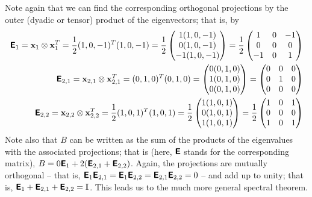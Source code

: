 {Note again that we can find the corresponding orthogonal projections by the outer (dyadic or tensor) product
of the eigenvectors; that is,  by
\begin{equation}
\begin{split}
\textsf{\textbf{E}}_1 =
{\bf x}_1 \otimes {\bf x}_1^T =
\frac{1}{2} (1,0,-1)^T(1,0,-1) =
\frac{1}{2}
\begin{pmatrix}
1(1,0,-1)\\
0(1,0,-1)\\
-1(1,0,-1)
\end{pmatrix} =
\frac{1}{2}
\begin{pmatrix}
1&0&-1\\
0&0&0\\
-1&0&1
\end{pmatrix}
\\
\textsf{\textbf{E}}_{2,1} =
{\bf x}_{2,1} \otimes {\bf x}_{2,1}^T =
(0,1,0)^T(0,1,0) =
\begin{pmatrix}
0(0,1,0)\\
1(0,1,0)\\
0(0,1,0)
\end{pmatrix} =
\begin{pmatrix}
0&0&0\\
0&1&0\\
0&0&0
\end{pmatrix}
\\
\textsf{\textbf{E}}_{2,2} =
{\bf x}_{2,2} \otimes {\bf x}_{2,2}^T =
\frac{1}{2} (1,0,1)^T(1,0,1) =
\frac{1}{2}
\begin{pmatrix}
1(1,0,1)\\
0(1,0,1)\\
1(1,0,1)
\end{pmatrix} =
\frac{1}{2}
\begin{pmatrix}
1&0&1\\
0&0&0\\
1&0&1
\end{pmatrix}
\end{split}
\end{equation}
Note also that $B$ can be written as the sum of the products of the
eigenvalues with the associated projections; that is (here, $\textsf{\textbf{E}}$
stands for the corresponding matrix),
$B= 0  \textsf{\textbf{E}}_1 + 2 (\textsf{\textbf{E}}_{2,1} + \textsf{\textbf{E}}_{2,2} )$.
Again, the projections are mutually orthogonal
-- that is,
$\textsf{\textbf{E}}_1 \textsf{\textbf{E}}_{2,1} = \textsf{\textbf{E}}_1\textsf{\textbf{E}}_{2,2}=
\textsf{\textbf{E}}_{2,1}\textsf{\textbf{E}}_{2,2}=0$
--
and add up to unity; that is,
$\textsf{\textbf{E}}_1+\textsf{\textbf{E}}_{2,1}+\textsf{\textbf{E}}_{2,2}={\Bbb I}$.
This leads us to the much more general spectral theorem.

}

